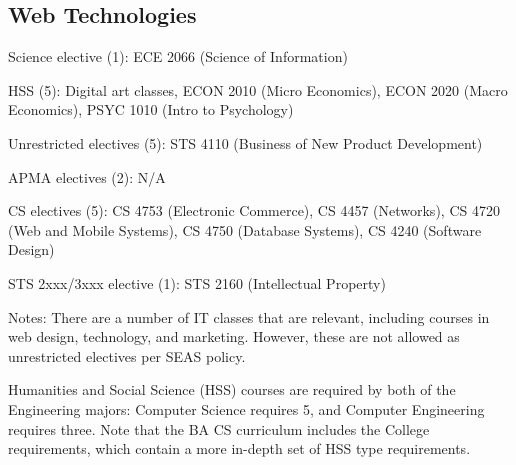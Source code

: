 \subsection{Web Technologies}
\begin{itemlist}
\item Science elective (1): ECE 2066 (Science of Information)
\item HSS (5): Digital art classes, ECON 2010 (Micro Economics), ECON 2020 (Macro Economics), PSYC 1010 (Intro to Psychology)
\item Unrestricted electives (5): STS 4110 (Business of New Product Development)
\item APMA electives (2): N/A
\item CS electives (5): CS 4753 (Electronic Commerce), CS 4457 (Networks), CS 4720 (Web and Mobile Systems), CS 4750 (Database Systems), CS 4240 (Software Design)
\item STS 2xxx/3xxx elective (1): STS 2160 (Intellectual Property)
\item Notes: There are a number of IT classes that are relevant, including courses in web design, technology, and marketing.  However, these are not allowed as unrestricted electives per SEAS policy. 
\end{itemlist}


\fi

\label{hsselectives}

Humanities and Social Science (HSS) courses are required by both of
the Engineering majors: Computer Science requires 5, and Computer
Engineering requires three.  Note that the BA CS curriculum includes
the College
requirements,
which contain a more in-depth set of HSS type requirements.

